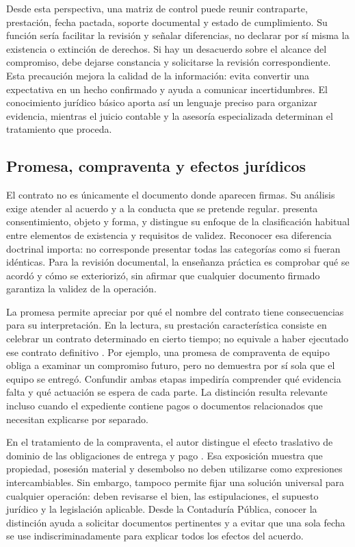 {Desde esta perspectiva, una matriz de control puede reunir contraparte, prestación, fecha pactada, soporte documental y estado de cumplimiento. Su función sería facilitar la revisión y señalar diferencias, no declarar por sí misma la existencia o extinción de derechos. Si hay un desacuerdo sobre el alcance del compromiso, debe dejarse constancia y solicitarse la revisión correspondiente. Esta precaución mejora la calidad de la información: evita convertir una expectativa en un hecho confirmado y ayuda a comunicar incertidumbres. El conocimiento jurídico básico aporta así un lenguaje preciso para organizar evidencia, mientras el juicio contable y la asesoría especializada determinan el tratamiento que proceda.

\clearpage
\subsection*{Promesa, compraventa y efectos jurídicos}

El contrato no es únicamente el documento donde aparecen firmas. Su análisis exige atender al acuerdo y a la conducta que se pretende regular. \textcite[13--18]{zamoraContratos} presenta consentimiento, objeto y forma, y distingue su enfoque de la clasificación habitual entre elementos de existencia y requisitos de validez. Reconocer esa diferencia doctrinal importa: no corresponde presentar todas las categorías como si fueran idénticas. Para la revisión documental, la enseñanza práctica es comprobar qué se acordó y cómo se exteriorizó, sin afirmar que cualquier documento firmado garantiza la validez de la operación.

La promesa permite apreciar por qué el nombre del contrato tiene consecuencias para su interpretación. En la lectura, su prestación característica consiste en celebrar un contrato determinado en cierto tiempo; no equivale a haber ejecutado ese contrato definitivo \parencite[75--76]{zamoraContratos}. Por ejemplo, una promesa de compraventa de equipo obliga a examinar un compromiso futuro, pero no demuestra por sí sola que el equipo se entregó. Confundir ambas etapas impediría comprender qué evidencia falta y qué actuación se espera de cada parte. La distinción resulta relevante incluso cuando el expediente contiene pagos o documentos relacionados que necesitan explicarse por separado.

En el tratamiento de la compraventa, el autor distingue el efecto traslativo de dominio de las obligaciones de entrega y pago \parencite[95--96]{zamoraContratos}. Esa exposición muestra que propiedad, posesión material y desembolso no deben utilizarse como expresiones intercambiables. Sin embargo, tampoco permite fijar una solución universal para cualquier operación: deben revisarse el bien, las estipulaciones, el supuesto jurídico y la legislación aplicable. Desde la Contaduría Pública, conocer la distinción ayuda a solicitar documentos pertinentes y a evitar que una sola fecha se use indiscriminadamente para explicar todos los efectos del acuerdo.

}
